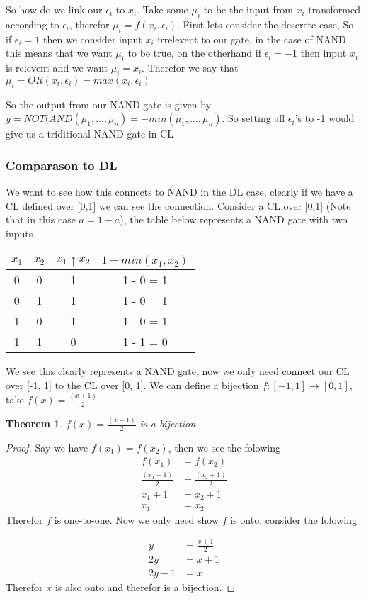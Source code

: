 \documentclass{article}
\newtheorem{theorem}{Theorem}
\begin{document}
So how do we link our $\epsilon_i$ to $x_i$. Take some $\mu_i$ to be the input from $x_i$ transformed according to $\epsilon_i$, therefor $\mu_i = f(x_i, \epsilon_i)$. First lets consider the descrete case, So if $\epsilon_i = 1$ then we consider input $x_i$ irrelevent to our gate, in the case of NAND this means that we want $\mu_i$ to be true, on the otherhand if $\epsilon_i = -1$ then input $x_i$ is relevent and we want $\mu_i = x_i$. Therefor we say that $\mu_i = OR(x_i, \epsilon_i) = max(x_i, \epsilon_i)$ 

So the output from our NAND gate is given by $y = NOT(AND(\mu_1, ..., \mu_n) = -min(\mu_1, ..., \mu_n)$. So setting all $\epsilon_i$'s to -1 would give us a triditional NAND gate in CL

\subsubsection{Comparason to DL}
We want to see how this connects to NAND in the DL case, clearly if we have a CL defined over [0,1] we can see the connection. Consider a CL over [0,1] (Note that in this case $\bar{a} = 1 - a$), the table below represents a NAND gate with two inputs

\begin{center}
\begin{tabular}{| c | c | c | c |}
\hline
$x_1$ & $x_2$ & $x_1 \uparrow x_2$ & $1 - min(x_1, x_2)$ \\
\hline
\hline
0 & 0 & 1 & 1 - 0 = 1 \\
0 & 1 & 1 & 1 - 0 = 1 \\
1 & 0 & 1 & 1 - 0 = 1 \\
1 & 1 & 0 & 1 - 1 = 0 \\
\hline
\end{tabular}
\end{center}

We see this clearly represents a NAND gate, now we only need connect our CL over [-1, 1] to the CL over [0, 1]. We can define a bijection $f: [-1, 1] \longrightarrow [0, 1]$, take $f(x) = \frac{(x + 1)}{2}$

\begin{theorem}
$f(x) = \frac{(x + 1)}{2}$ is a bijection
\end{theorem}

\begin{proof}
Say we have $f(x_1) = f(x_2)$, then we see the folowing
\begin{align*}
f(x_1) &= f(x_2)\\
\frac{(x_1 + 1)}{2} &= \frac{(x_2 + 1)}{2}\\
x_1 + 1 &= x_2 + 1\\
x_1 &= x_2
\end{align*}
Therefor $f$ is one-to-one. Now we only need show $f$ is onto, consider the folowing

\begin{align*}
y &= \frac{x + 1}{2} \\
2y &= x + 1\\
2y - 1 &= x
\end{align*}
Therefor $x$ is also onto and therefor is a bijection.
\end{proof}
\end{document}
